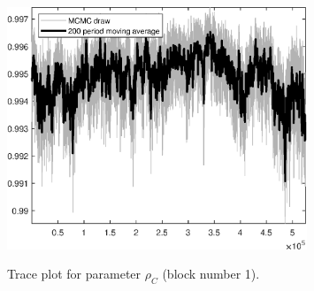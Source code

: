 \begin{figure}[H]
\centering
  \includegraphics[width=0.8\textwidth]{BRS_growth_KPR/graphs/TracePlot_rho_C_blck_1}\\
    \caption{Trace plot for parameter ${\rho_C}$ (block number 1).}
\end{figure}
